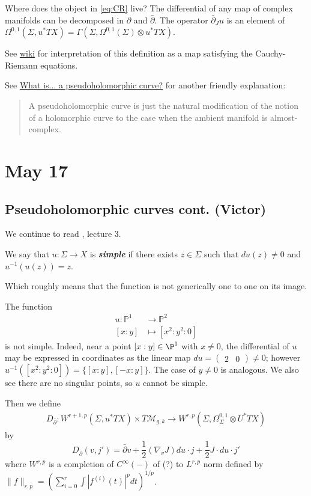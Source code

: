 \begin{question}
	Where does the object in \cref{eq:CR} live? The differential of any map of complex manifolds can be decomposed in $\partial$ and $\bar\partial$. The operator $\bar\partial_Ju$ is an element of $\Omega^{0,1}(\Sigma,u^* TX)=\Gamma(\Sigma,\Omega^{0,1}(\Sigma)\otimes u^*TX)$.
\end{question}
\begin{remark}
	See \href{https://en.wikipedia.org/wiki/Pseudoholomorphic_curve#Analogy_with_the_classical_Cauchy–Riemann_equations}{wiki} for interpretation of this definition as a map satisfying the Cauchy-Riemann equations.
\end{remark}
\begin{remark}
	See \href{http://members.unine.ch/felix.schlenk/Maths/What/pseudoholomorphic.pdf}{What is... a pseudoholomorphic curve?} for another friendly explanation:
	\begin{quotation}
		A pseudoholomorphic curve is just the natural modification of the notion of a holomorphic curve to the case when the ambient manifold is almost-complex.
	\end{quotation}
\end{remark}

\section{May 17}
\subsection{Pseudoholomorphic curves cont. (Victor)}
We continue to read \cite{aroux}, lecture 3.
\begin{defn}
	We say that $u:\Sigma\to X$ is \textbf{\textit{simple}} if there exists $z\in\Sigma$ such that $du(z)\neq0$ and $u^{-1}(u(z))={z}$.
\end{defn}
Which roughly means that the function is not generically one to one on its image.
\begin{example}
	The function
	\begin{align*}
		u:\mathbb{P}^1&\to\mathbb{P}^2\\
		[x:y]&\mapsto[x^2:y^2:0]
	\end{align*}
	is not simple. Indeed, near a point $[x:y]\in\P^1$ with $x\neq0$, the differential of $u$ may be expressed in coordinates as the linear map $du=\begin{pmatrix}
		2&0
	\end{pmatrix}\neq0$; however $u^{-1}([x^2:y^2:0])=\{[x:y],[-x:y]\}$. The case of $y\neq0$ is analogous. We also see there are no singular points, so $u$ cannot be simple.
\end{example}
Then we define
\begin{align*}
	D_{\bar\partial}:W^{r+1,p}(\Sigma,u^*TX)\times T\mathcal{M}_{g,k}\to W^{r,p}(\Sigma,\Omega^{0,1}_\Sigma\otimes U^*TX)
\end{align*}
by 
\[D_{\bar\partial}(v,j')=\bar\partial v+\frac{1}{2}(\nabla_vJ)du\cdot j+\frac{1}{2}J\cdot du\cdot j'\]
where $W^{r,p}$ is a completion of $C^\infty(-)$ of (?) to $L^{r,p}$ norm defined by $\|f\|_{r,p}=\left(\sum_{i=0}^r\int|f^{(i)}(t)|^pdt\right)^{1/p}$.

